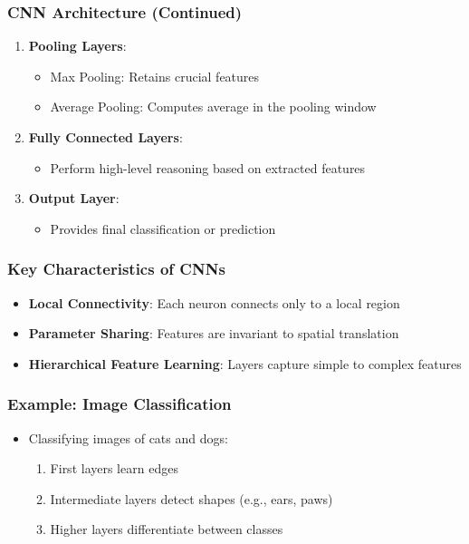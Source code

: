 \documentclass[aspectratio=169]{beamer}
\begin{document}
\begin{frame}[fragile]
    \frametitle{CNN Architecture (Continued)}
    \begin{enumerate}[resume]
        \item \textbf{Pooling Layers}:
        \begin{itemize}
            \item Max Pooling: Retains crucial features
            \item Average Pooling: Computes average in the pooling window
        \end{itemize}
        
        \item \textbf{Fully Connected Layers}:
        \begin{itemize}
            \item Perform high-level reasoning based on extracted features
        \end{itemize}
        
        \item \textbf{Output Layer}:
        \begin{itemize}
            \item Provides final classification or prediction
        \end{itemize}
    \end{enumerate}
\end{frame}

\begin{frame}[fragile]
    \frametitle{Key Characteristics of CNNs}
    \begin{itemize}
        \item \textbf{Local Connectivity}: Each neuron connects only to a local region
        \item \textbf{Parameter Sharing}: Features are invariant to spatial translation
        \item \textbf{Hierarchical Feature Learning}: Layers capture simple to complex features
    \end{itemize}
\end{frame}

\begin{frame}[fragile]
    \frametitle{Example: Image Classification}
    \begin{itemize}
        \item Classifying images of cats and dogs:
        \begin{enumerate}
            \item First layers learn edges
            \item Intermediate layers detect shapes (e.g., ears, paws)
            \item Higher layers differentiate between classes
        \end{enumerate}
    \end{itemize}
\end{frame}
\end{document}
